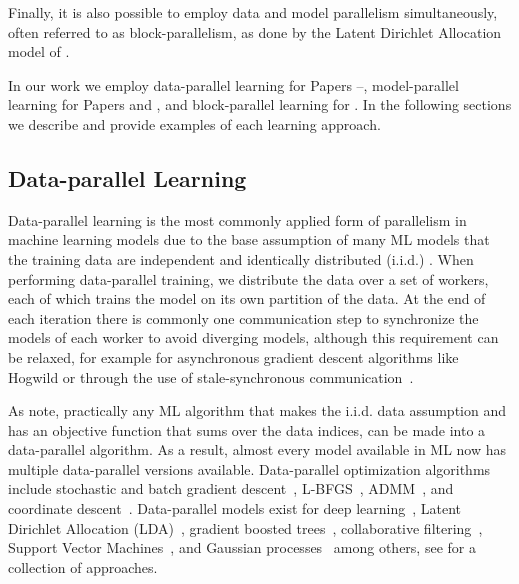 Finally, it is also possible to employ data and model parallelism simultaneously,
often referred to as block-parallelism, as done by the Latent Dirichlet Allocation
model of \cite{petuum}.

In our work we employ data-parallel learning for Papers \conceptsicdmNum--\sessionlengthNum,
model-parallel learning for Papers \uncertaintreesNum and \boostvhtNum, and
block-parallel learning for \blockgbt. In the following sections we describe and provide
examples of each learning approach.

\subsection*{Data-parallel Learning}
\label{sec:bg-data-parallel}

Data-parallel learning is the most commonly applied form of parallelism
in machine learning models due to the base assumption of many ML models
that the training data are independent and identically distributed (i.i.d.)
\cite{distributed-ml-design}. When performing data-parallel training, we
distribute the data over a set of workers, each of which trains the model
on its own partition of the data. At the end of each iteration there is commonly one communication step
to synchronize the models of each worker to avoid diverging models, although
this requirement can be relaxed, for example for asynchronous gradient descent
algorithms like Hogwild \cite{hogwild} or through the use of stale-synchronous
communication~\cite{stale-sync-ps}.

As \citet{distributed-ml-design} note, practically any ML algorithm that makes
the i.i.d. data assumption and has an objective function that sums over
the data indices, can be made into a data-parallel algorithm. As a result,
almost every model available in ML now has multiple data-parallel versions
available. Data-parallel optimization algorithms include stochastic and batch gradient
descent~\cite{dekel-optimal-distributed, parallel-sgd}, L-BFGS~\cite{lbfgs-large-scale, vw},
ADMM~\cite{admm, admm-async}, and coordinate descent~\cite{rendle-distributed-cd, parallel-cd}.
Data-parallel models exist for deep learning~\cite{large-scale-dl}, Latent Dirichlet Allocation (LDA)~\cite{parallel-lda},
gradient boosted trees~\cite{xgboost, lightgbm}, collaborative filtering~\cite{koren-cf, parallel-cf}, Support Vector Machines~\cite{parallel-svm, psvm, parallel-svm-survey}, and Gaussian processes~\cite{gp-big-data, gp-distributed} among others,
see \cite{parallel-ml-book} for a collection of approaches.

